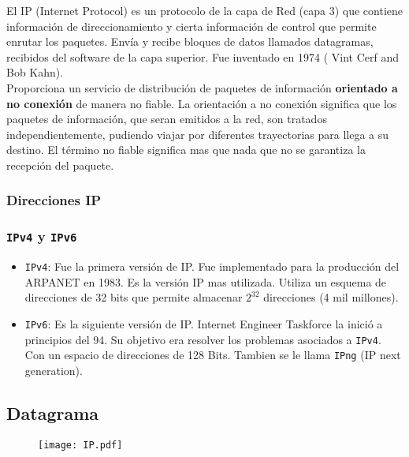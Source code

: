El IP (Internet Protocol) es un protocolo de la capa de Red (capa 3) que contiene información de direccionamiento y cierta información de control que permite enrutar los paquetes. Envía y recibe bloques de datos llamados datagramas, recibidos del software de la capa superior. Fue inventado en 1974 ( Vint Cerf and Bob Kahn). \\${ }$\\
Proporciona un servicio de distribución de paquetes de información \textbf{orientado a no conexión} de manera no fiable. La orientación a no conexión significa que los paquetes de información, que seran emitidos a la red, son tratados independientemente, pudiendo viajar por diferentes trayectorias para llega a su destino. El término no fiable significa mas que nada que no se garantiza la recepción del paquete.
\subsubsection*{Direcciones IP}
\subsubsection*{\texttt{IPv4} y \texttt{IPv6}}
\begin{itemize}
\item \texttt{IPv4}: Fue la primera versión de IP. Fue implementado para la producción del ARPANET en 1983. Es la versión IP mas utilizada. Utiliza un esquema de direcciones de 32 bits que permite almacenar $2^{32}$ direcciones (4 mil millones).
\item \texttt{IPv6}: Es la siguiente versión de IP. Internet Engineer Taskforce la inició a principios del 94. Su objetivo era resolver los problemas asociados a \texttt{IPv4}. Con un espacio de direcciones de 128 Bits. Tambien se le llama \texttt{IPng} (IP next generation).
\end{itemize}

\subsection*{Datagrama}

\begin{figure}[H]                           
\centering                                  
\texttt{[image: IP.pdf]}
\end{figure}                

